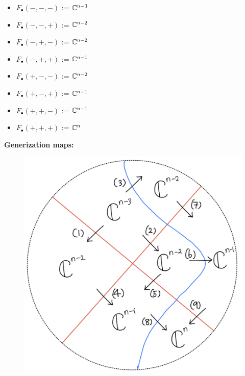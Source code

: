 \begin{itemize}
\item $F_\bullet(-,-,-)$ := $\mathbb{C}^{n-3}$
\item $F_\bullet(-,-,+)$ := $\mathbb{C}^{n-2}$
\item $F_\bullet(-,+,-)$ := $\mathbb{C}^{n-2}$
\item $F_\bullet(-,+,+)$ := $\mathbb{C}^{n-1}$
\item $F_\bullet(+,-,-)$ := $\mathbb{C}^{n-2}$
\item $F_\bullet(+,-,+)$ := $\mathbb{C}^{n-1}$
\item $F_\bullet(+,+,-)$ := $\mathbb{C}^{n-1}$
\item $F_\bullet(+,+,+)$ := $\mathbb{C}^n$
\end{itemize}

\textbf{Generization maps:}
\begin{figure}[H]
    \centering
    \includegraphics[scale = 0.95]{diagrams/cobord'4/28.png}
    \caption{}
    \label{fig:your-label}
\end{figure}
